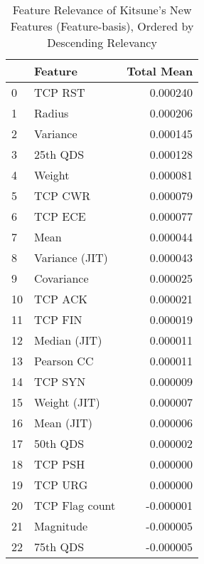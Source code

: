 \begin{table}
\caption{Feature Relevance of Kitsune's New Features (Feature-basis), Ordered by Descending Relevancy}
\label{tab:shap-orig-feat}
\begin{tabular}{llr}
\toprule
 & Feature & Total Mean \\
\midrule
0 & TCP RST & 0.000240 \\
1 & Radius & 0.000206 \\
2 & Variance & 0.000145 \\
3 & 25th QDS & 0.000128 \\
4 & Weight & 0.000081 \\
5 & TCP CWR & 0.000079 \\
6 & TCP ECE & 0.000077 \\
7 & Mean & 0.000044 \\
8 & Variance (JIT) & 0.000043 \\
9 & Covariance & 0.000025 \\
10 & TCP ACK & 0.000021 \\
11 & TCP FIN & 0.000019 \\
12 & Median (JIT) & 0.000011 \\
13 & Pearson CC & 0.000011 \\
14 & TCP SYN & 0.000009 \\
15 & Weight (JIT) & 0.000007 \\
16 & Mean (JIT) & 0.000006 \\
17 & 50th QDS & 0.000002 \\
18 & TCP PSH & 0.000000 \\
19 & TCP URG & 0.000000 \\
20 & TCP Flag count & -0.000001 \\
21 & Magnitude & -0.000005 \\
22 & 75th QDS & -0.000005 \\
\bottomrule
\end{tabular}
\end{table}

